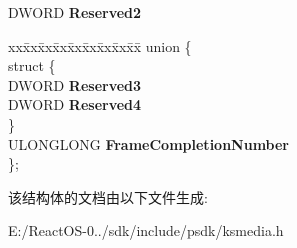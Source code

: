 \begin{DoxyCompactItemize}
\begin{tabbing}
\end{tabbing}\item 
\mbox{\label{structtag_k_s___f_r_a_m_e___i_n_f_o_a5f1349ad5047b60bf95c0829e23dc50b}} 
D\+W\+O\+RD {\bfseries Reserved2}
\item 
\mbox{\label{structtag_k_s___f_r_a_m_e___i_n_f_o_a1cbf581a0706fee691e9035908da258c}} 
\begin{tabbing}
xx\=xx\=xx\=xx\=xx\=xx\=xx\=xx\=xx\=\kill
union \{\\
\mbox{\label{uniontag_k_s___f_r_a_m_e___i_n_f_o_1_1_0D2572_a336793359dfed698550a472f5de77a24}} 
\>struct \{\\
\>\>DWORD {\bfseries Reserved3}\\
\>\>DWORD {\bfseries Reserved4}\\
\>\} \\
\>ULONGLONG {\bfseries FrameCompletionNumber}\\
\}; \\

\end{tabbing}\end{DoxyCompactItemize}


该结构体的文档由以下文件生成\+:\begin{DoxyCompactItemize}
\item 
E\+:/\+React\+O\+S-\/0../sdk/include/psdk/ksmedia.\+h\end{DoxyCompactItemize}
